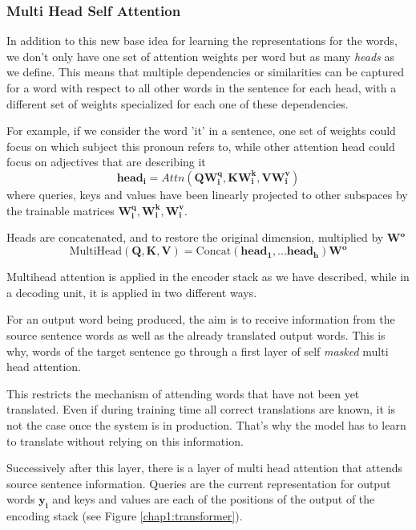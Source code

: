 \documentclass[11pt,english,listoffigures,listoftables]{tfgetsinf}
\newcommand{\vect}[1]{\mathbf{#1}}
\begin{document}
\subsubsection{Multi Head Self Attention}
In addition to this new base idea for learning the representations for the words, we don't only have one set of attention weights per word but as many \textit{heads} as we define. This means that multiple dependencies or similarities can be captured for a word with respect to all other words in the sentence for each head, with a different set of weights specialized for each one of these dependencies.

For example, if we consider the word 'it' in a sentence, one set of weights could focus on which subject this pronoun refers to, while other attention head could focus on adjectives that are describing it
\begin{equation}
    \vect{head_i}=Attn(\vect{Q}\vect{W^q_i}, \vect{K}\vect{W^k_i}, \vect{V}\vect{W^v_i})
\end{equation}
where queries, keys and values have been linearly projected to other subspaces by the trainable matrices $\vect{W_i^q}, \vect{W_i^k}, \vect{W_i^v}$.

Heads are concatenated, and to restore the original dimension, multiplied by $\vect{W^o}$
\begin{equation}
    \text{MultiHead}(\vect{Q},\vect{K},\vect{V}) = \text{Concat}(\vect{head_1},...\vect{head_h})\vect{W^o}
\end{equation}

Multihead attention is applied in the encoder stack as we have described, while in a decoding unit, it is applied in two different ways.

For an output word being produced, the aim is to receive information from the source sentence words as well as the already translated output words. This is why, words of the target sentence go through a first layer of self \textit{masked} multi head attention.

This restricts the mechanism of attending words that have not been yet translated. Even if during training time all correct translations are known, it is not the case once the system is in production. That's why the model has to learn to translate without relying on this information.

Successively after this layer, there is a layer of multi head attention that attends source sentence information. Queries are the current representation for output words $\vect{y_i}$ and keys and values are each of the positions of the output of the encoding stack (see Figure \ref{chap1:transformer}).
\end{document}
